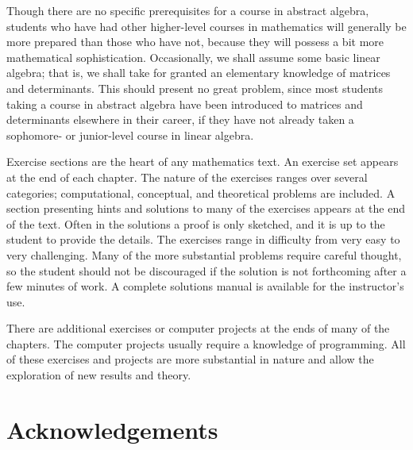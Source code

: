  
 
Though there are no specific prerequisites for a course in abstract
algebra, students who have had other higher-level courses in
mathematics will generally be more prepared than those who have not,
because they will possess a bit more mathematical sophistication.
Occasionally, we shall assume some basic linear algebra; that is, we
shall take for granted an elementary knowledge of matrices and
determinants. This should present no great problem, since most
students taking a course in abstract algebra have been introduced to
matrices and determinants elsewhere in their career, if they have not
already taken a sophomore- or junior-level course in linear algebra.   
 
 

 
Exercise sections are the heart of any mathematics text. An exercise
set appears at the end of each chapter. The nature of the exercises
ranges over several categories; computational,  conceptual, and
theoretical problems are included. A section presenting hints and
solutions to many of the exercises appears at the end of the text.
Often in the solutions a proof is only sketched, and it is up to the
student to provide the details. The exercises range in difficulty from
very easy to very challenging. Many of the more substantial problems
require careful thought, so the student should not be discouraged if
the solution is not forthcoming after a few minutes of work. A
complete solutions manual is available for the instructor's use. 


There are additional exercises or computer projects at the ends of
many of the chapters. The computer projects usually require a
knowledge of programming. All of these exercises and projects are more
substantial in nature and allow the exploration of new results and
theory.
 

 
 

 
 
 
 
 
 
 
 
 
 
 
 

 
\section*{Acknowledgements}
 
